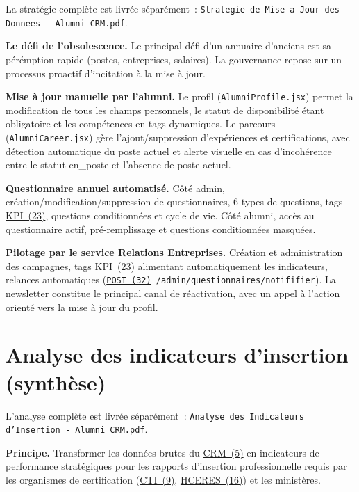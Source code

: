 \documentclass[12pt,a4paper]{report}
\begin{document}
\label{app:strategie}
La stratégie complète est livrée séparément~: \texttt{Strategie de Mise a Jour des Donnees - Alumni CRM.pdf}.

\textbf{Le défi de l'obsolescence.} Le principal défi d'un annuaire d'anciens est sa pérémption rapide (postes, entreprises, salaires). La gouvernance repose sur un processus proactif d'incitation à la mise à jour.

\textbf{Mise à jour manuelle par l'alumni.} Le profil (\texttt{AlumniProfile.jsx}) permet la modification de tous les champs personnels, le statut de disponibilité étant obligatoire et les compétences en tags dynamiques. Le parcours (\texttt{AlumniCareer.jsx}) gère l'ajout/suppression d'expériences et certifications, avec détection automatique du poste actuel et alerte visuelle en cas d'incohérence entre le statut \og{}en\_poste\fg{} et l'absence de poste actuel.

\textbf{Questionnaire annuel automatisé.} Côté admin, création/modification/suppression de questionnaires, 6 types de questions, tags \hyperlink{abbr-KPI}{KPI~(23)}, questions conditionnées et cycle de vie. Côté alumni, accès au questionnaire actif, pré-remplissage et questions conditionnées masquées.

\textbf{Pilotage par le service Relations Entreprises.} Création et administration des campagnes, tags \hyperlink{abbr-KPI}{KPI~(23)} alimentant automatiquement les indicateurs, relances automatiques (\texttt{\hyperlink{abbr-POST}{POST~(32)} /admin/questionnaires/notififier}). La newsletter constitue le principal canal de réactivation, avec un appel à l'action orienté vers la mise à jour du profil.

\chapter{Analyse des indicateurs d'insertion (synthèse)}

\label{app:indicateurs}
L'analyse complète est livrée séparément~: \texttt{Analyse des Indicateurs d'Insertion - Alumni CRM.pdf}.

\textbf{Principe.} Transformer les données brutes du \hyperlink{abbr-CRM}{CRM~(5)} en indicateurs de performance stratégiques pour les rapports d'insertion professionnelle requis par les organismes de certification (\hyperlink{abbr-CTI}{CTI~(9)}, \hyperlink{abbr-HCERES}{HCERES~(16)}) et les ministères.
\end{document}
